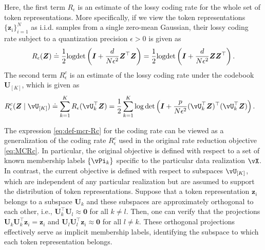 \documentclass[../../book-main.tex]{subfiles}
\begin{document}
Here, the first term $R_{\epsilon}$ is an estimate of the lossy coding rate for the whole set of token representations. More specifically, if we view the token representations $\{\bm z_i\}_{i=1}^N$ as i.i.d. samples from a single zero-mean Gaussian, their lossy coding rate subject to a quantization precision $\epsilon > 0$ is given as
\begin{equation}\label{eq:coding_rate}
    R_{\epsilon}(\bm{Z}) \doteq \frac{1}{2}\textrm{logdet}\left(\bm{I} + \frac{d}{N\epsilon^{2}}\bm{Z}^{\top}\bm{Z}\right) = \frac{1}{2}\textrm{logdet}\left(\bm{I} + \frac{d}{N\epsilon^{2}}\bm{Z}\bm{Z}^{\top}\right).
\end{equation}
The second term $R_{\epsilon}^c$ is an estimate of the lossy coding rate under the codebook $\bm U_{[K]}$, which is given as 
\begin{equation}
\begin{aligned}
    R_{\epsilon}^c(\Z \mid \vU_{[K]}) &\doteq \sum_{k=1}^{K}R_{\epsilon}(\vU_k^{\top} \Z) = \frac{1}{2}\sum_{k=1}^{K}\log\det\left(\I +
    \frac{p}{N\epsilon^{2}}(\vU_k^{\top}\Z)^{\top}(\vU_k^{\top}\Z)\right).
\end{aligned}
\label{eq:def-mcr-Rc}
\end{equation}

\begin{remark}
    The expression \eqref{eq:def-mcr-Rc} for the coding rate can be viewed as a generalization of the coding rate \(R_\epsilon^{c}\) used in the original rate reduction objective \eqref{eq:MCRc}. In particular, the original objective is defined with respect to a set of known membership labels \(\{\vPi_{k}\}\) specific to the particular data realization \(\vX\). In contrast, the current objective is defined with respect to subspaces \(\vU_{[K]}\), which are independent of any particular realization but are assumed to support the distribution of token representations. Suppose that a token representation $\bm z_i$ belongs to a subspace $\bm U_k$ and these subspaces are approximately orthogonal to each other, i.e., $\bm U_k^\top \bm U_l \approx \bm 0$ for all $k \neq l$. Then, one can verify that the projections $\bm U_k\bm U_k^\top \bm z_i  = \bm z_i$ and  $\bm U_l\bm U_l^\top \bm z_i \approx \bm 0$ for all $l \neq k$. These orthogonal projections effectively serve as implicit membership labels, identifying the subspace to which each token representation belongs. 
\end{remark}
\end{document}
